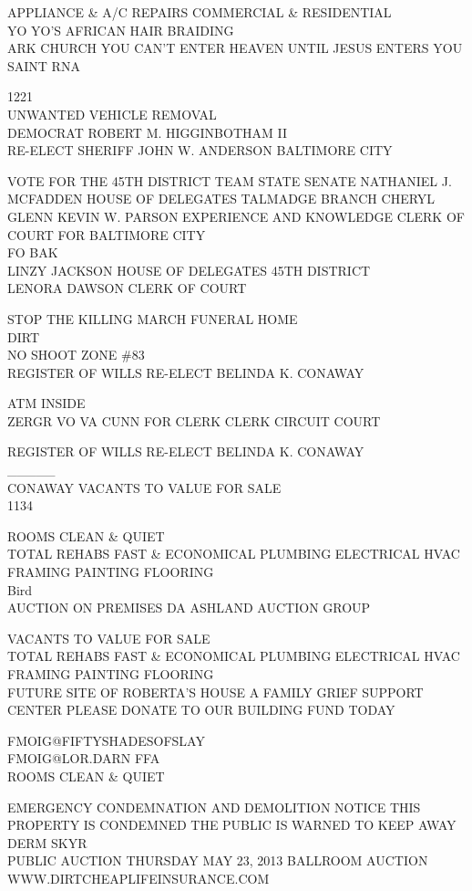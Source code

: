 \documentclass[10pt,letterpaper]{article}
\begin{document}
APPLIANCE \& A/C REPAIRS COMMERCIAL \& RESIDENTIAL\\
YO YO'S AFRICAN HAIR BRAIDING\\
ARK CHURCH YOU CAN'T ENTER HEAVEN UNTIL JESUS ENTERS YOU\\
SAINT RNA

1221\\
UNWANTED VEHICLE REMOVAL\\
DEMOCRAT ROBERT M. HIGGINBOTHAM II\\
RE{-}ELECT SHERIFF JOHN W. ANDERSON BALTIMORE CITY

VOTE FOR THE 45TH DISTRICT TEAM STATE SENATE NATHANIEL J. MCFADDEN HOUSE OF DELEGATES TALMADGE BRANCH CHERYL GLENN KEVIN W. PARSON EXPERIENCE AND KNOWLEDGE CLERK OF COURT FOR BALTIMORE CITY\\
FO BAK\\
LINZY JACKSON HOUSE OF DELEGATES 45TH DISTRICT\\
LENORA DAWSON CLERK OF COURT

STOP THE KILLING MARCH FUNERAL HOME\\
DIRT\\
NO SHOOT ZONE \#83\\
REGISTER OF WILLS RE{-}ELECT BELINDA K. CONAWAY

ATM INSIDE\\
ZERGR VO VA CUNN FOR CLERK CLERK CIRCUIT COURT

REGISTER OF WILLS RE{-}ELECT BELINDA K. CONAWAY\\
\_\_\_\_\_\\
CONAWAY VACANTS TO VALUE FOR SALE\\
1134

ROOMS CLEAN \& QUIET\\
TOTAL REHABS FAST \& ECONOMICAL PLUMBING ELECTRICAL HVAC FRAMING PAINTING FLOORING\\
Bird\\
AUCTION ON PREMISES DA ASHLAND AUCTION GROUP

VACANTS TO VALUE FOR SALE\\
TOTAL REHABS FAST \& ECONOMICAL PLUMBING ELECTRICAL HVAC FRAMING PAINTING FLOORING\\
FUTURE SITE OF ROBERTA'S HOUSE A FAMILY GRIEF SUPPORT CENTER PLEASE DONATE TO OUR BUILDING FUND TODAY

FMOIG@FIFTYSHADESOFSLAY\\
FMOIG@LOR.DARN FFA\\
ROOMS CLEAN \& QUIET

EMERGENCY CONDEMNATION AND DEMOLITION NOTICE THIS PROPERTY IS CONDEMNED THE PUBLIC IS WARNED TO KEEP AWAY\\
DERM SKYR\\
PUBLIC AUCTION THURSDAY MAY 23, 2013 BALLROOM AUCTION\\
WWW.DIRTCHEAPLIFEINSURANCE.COM
\end{document}
